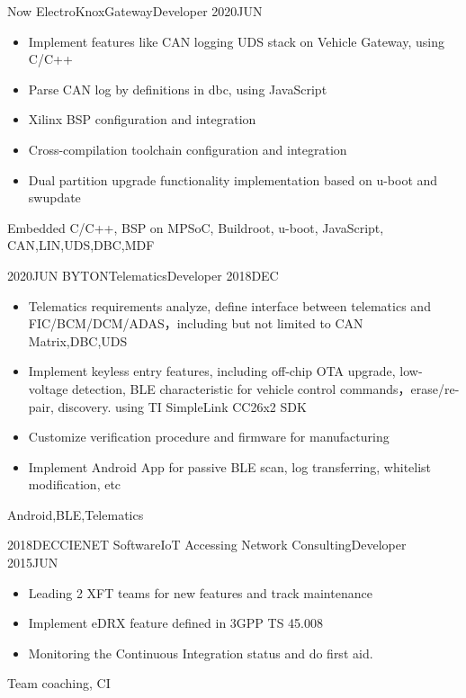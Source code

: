 %
%


 
\begin{experiences}
	
	\experience
	{Now} {ElectroKnox}{Gateway}{Developer}
	{2020JUN }    {
		\begin{itemize}
			\item Implement features like CAN logging  UDS stack on Vehicle Gateway, using C/C++
			\item Parse CAN log by definitions in dbc, using JavaScript
			\item Xilinx BSP configuration and integration
			\item Cross-compilation toolchain configuration and integration
			\item Dual partition upgrade functionality implementation based on u-boot and swupdate
		\end{itemize}
	}
	{Embedded C/C++, BSP on MPSoC, Buildroot, u-boot, JavaScript, CAN,LIN,UDS,DBC,MDF}
	
	\emptySeparator	
	\experience
	{2020JUN} {BYTON}{Telematics}{Developer}
	{2018DEC}    {
		\begin{itemize}
			\item Telematics requirements analyze, define interface between telematics and FIC/BCM/DCM/ADAS，including but not limited to CAN Matrix,DBC,UDS
			\item Implement keyless entry features, including off-chip OTA upgrade, low-voltage detection, BLE characteristic for vehicle control commands，erase/re-pair, discovery. using TI SimpleLink CC26x2 SDK
			\item Customize verification procedure and firmware for manufacturing
			\item Implement Android App for passive BLE scan, log transferring, whitelist modification, etc
		\end{itemize}
	}
	{Android,BLE,Telematics}
	
	\emptySeparator	
	\experience
	{2018DEC}{CIENET Software}{IoT Accessing Network Consulting}{Developer}
	{2015JUN} {
		\begin{itemize}
            \item Leading 2 XFT teams for new features and track maintenance
			\item Implement eDRX feature defined in 3GPP TS 45.008
			\item Monitoring the Continuous Integration status and do first aid.
		\end{itemize}
	}
	{Team coaching, CI}
		

\end{experiences}
